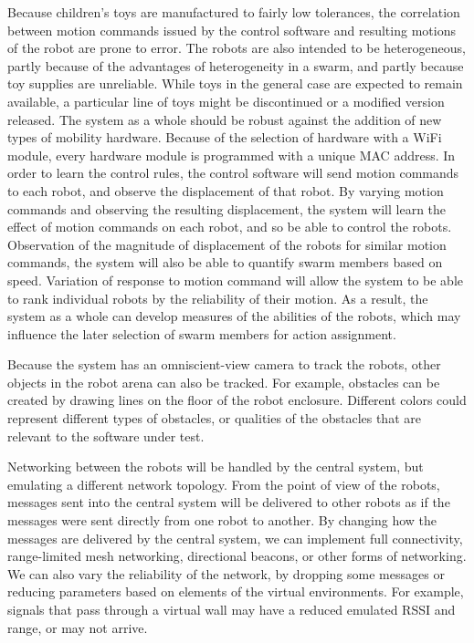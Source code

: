 \documentclass[]{article}
\begin{document}
Because children's toys are manufactured to fairly low tolerances, the correlation between motion commands issued by the control software and resulting motions of the robot are prone to error. 
The robots are also intended to be heterogeneous, partly because of the advantages of heterogeneity in a swarm, and partly because toy supplies are unreliable.
While toys in the general case are expected to remain available, a particular line of toys might be discontinued or a modified version released. 
The system as a whole should be robust against the addition of new types of mobility hardware. 
Because of the selection of hardware with a WiFi module, every hardware module is programmed with a unique MAC address. 
In order to learn the control rules, the control software will send motion commands to each robot, and observe the displacement of that robot. 
By varying motion commands and observing the resulting displacement, the system will learn the effect of motion commands on each robot, and so be able to control the robots. 
Observation of the magnitude of displacement of the robots for similar motion commands, the system will also be able to quantify swarm members based on speed. 
Variation of response to motion command will allow the system to be able to rank individual robots by the reliability of their motion. 
As a result, the system as a whole can develop measures of the abilities of the robots, which may influence the later selection of swarm members for action assignment. 

Because the system has an omniscient-view camera to track the robots, other objects in the robot arena can also be tracked. 
For example, obstacles can be created by drawing lines on the floor of the robot enclosure. 
Different colors could represent different types of obstacles, or qualities of the obstacles that are relevant to the software under test. 

Networking between the robots will be handled by the central system, but emulating a different network topology. 
From the point of view of the robots, messages sent into the central system will be delivered to other robots as if the messages were sent directly from one robot to another. 
By changing how the messages are delivered by the central system, we can implement full connectivity, range-limited mesh networking, directional beacons, or other forms of networking. 
We can also vary the reliability of the network, by dropping some messages or reducing parameters based on elements of the virtual environments. 
For example, signals that pass through a virtual wall may have a reduced emulated RSSI and range, or may not arrive. 
\end{document}
